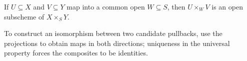 \begin{example}\label{ex:vi23-r19}
If $U\subseteq X$ and $V\subseteq Y$ map into a common open $W\subseteq S$, then $U\times_WV$ is an open subscheme of $X\times_SY$.
\end{example}

\begin{example}\label{ex:vi23-r20}
To construct an isomorphism between two candidate pullbacks, use the projections to obtain maps in both directions; uniqueness in the universal property forces the composites to be identities.
\end{example}
